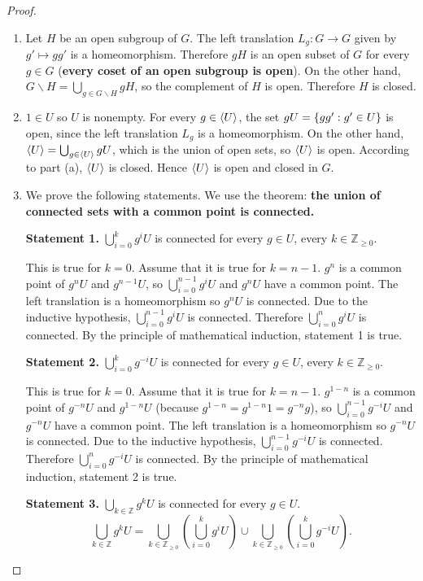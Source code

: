 \begin{proof}
	\begin{enumerate}[label={(\alph*)}]
		\item Let $H$ be an open subgroup of $G$. The left translation $L_{g}: G\to G$ given by $g'\mapsto gg'$ is a homeomorphism. Therefore $gH$ is an open subset of $G$ for every $g\in G$ (\textbf{every coset of an open subgroup is open}). On the other hand, $G\smallsetminus H = \bigcup_{g\in G\smallsetminus H} gH$, so the complement of $H$ is open. Therefore $H$ is closed.
		\item $1\in U$ so $U$ is nonempty. For every $g\in \left\langle{U}\right\rangle$, the set $gU = \left\{{ gg' : g'\in U }\right\}$ is open, since the left translation $L_{g}$ is a homeomorphism. On the other hand, $\left\langle{U}\right\rangle = \bigcup_{g\in \left\langle{U}\right\rangle}gU$, which is the union of open sets, so $\left\langle{U}\right\rangle$ is open. According to part (a), $\left\langle{U}\right\rangle$ is closed. Hence $\left\langle{U}\right\rangle$ is open and closed in $G$.
		\item We prove the following statements. We use the theorem: \textbf{the union of connected sets with a common point is connected.}

		      \textbf{Statement 1.} $\bigcup^{k}_{i=0} g^{i}U$ is connected for every $g\in U$, every $k\in \mathbb{Z}_{\geq 0}$.

		      This is true for $k = 0$. Assume that it is true for $k = n - 1$. $g^{n}$ is a common point of $g^{n}U$ and $g^{n-1}U$, so $\bigcup^{n-1}_{i=0}g^{i}U$ and $g^{n}U$ have a common point. The left translation is a homeomorphism so $g^{n}U$ is connected. Due to the inductive hypothesis, $\bigcup^{n-1}_{i=0}g^{i}U$ is connected. Therefore $\bigcup^{n}_{i=0}g^{i}U$ is connected. By the principle of mathematical induction, statement 1 is true.

		      \textbf{Statement 2.} $\bigcup^{k}_{i=0}g^{-i}U$ is connected for every $g\in U$, every $k\in \mathbb{Z}_{\geq 0}$.

		      This is true for $k = 0$. Assume that it is true for $k = n - 1$. $g^{1-n}$ is a common point of $g^{-n}U$ and $g^{1-n}U$ (because $g^{1-n} = g^{1-n}1 = g^{-n}g$), so $\bigcup^{n-1}_{i=0}g^{-i}U$ and $g^{-n}U$ have a common point. The left translation is a homeomorphism so $g^{-n}U$ is connected. Due to the inductive hypothesis, $\bigcup^{n-1}_{i=0}g^{-i}U$ is connected. Therefore $\bigcup^{n}_{i=0}g^{-i}U$ is connected. By the principle of mathematical induction, statement 2 is true.

		      \textbf{Statement 3.} $\bigcup_{k\in\mathbb{Z}}g^{k}U$ is connected for every $g\in U$.
		      \begin{equation*}
			      \bigcup_{k\in\mathbb{Z}}g^{k}U = \bigcup_{k\in\mathbb{Z}_{\geq 0}}\left(\bigcup^{k}_{i=0}g^{i}U\right) \cup \bigcup_{k\in\mathbb{Z}_{\geq 0}}\left(\bigcup^{k}_{i=0}g^{-i}U\right).
		      \end{equation*}


\end{enumerate}
\end{proof}
